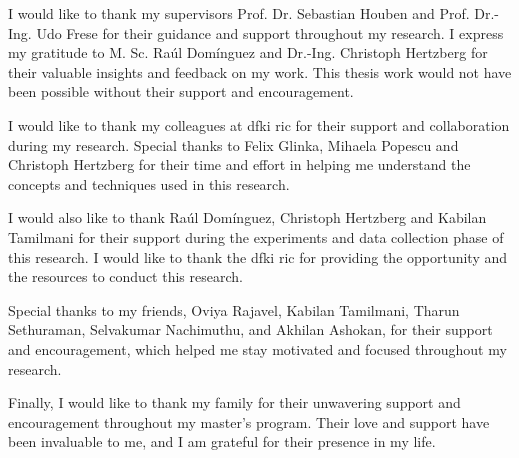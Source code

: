 \documentclass[report.tex]{subfiles}
\begin{document}
    \begin{acknowledgements}
        
        I would like to thank my supervisors Prof. Dr. Sebastian Houben and Prof. Dr.-Ing. Udo Frese for their guidance and support throughout my research. I express my gratitude to M. Sc. Raúl Domínguez and Dr.-Ing. Christoph Hertzberg for their valuable insights and feedback on my work. This thesis work would not have been possible without their support and encouragement. 
        
        I would like to thank my colleagues at \gls{dfki} \gls{ric} for their support and collaboration during my research. Special thanks to Felix Glinka, Mihaela Popescu and Christoph Hertzberg for their time and effort in helping me understand the concepts and techniques used in this research. 
        
        I would also like to thank Raúl Domínguez, Christoph Hertzberg and Kabilan Tamilmani for their support during the experiments and data collection phase of this research. I would like to thank the \gls{dfki} \gls{ric} for providing the opportunity and the resources to conduct this research. 
        
        Special thanks to my friends, Oviya Rajavel, Kabilan Tamilmani, Tharun Sethuraman, Selvakumar Nachimuthu, and Akhilan Ashokan, for their support and encouragement, which helped me stay motivated and focused throughout my research. 
        
        Finally, I would like to thank my family for their unwavering support and encouragement throughout my master's program. Their love and support have been invaluable to me, and I am grateful for their presence in my life.
       
    \end{acknowledgements}
\end{document}

